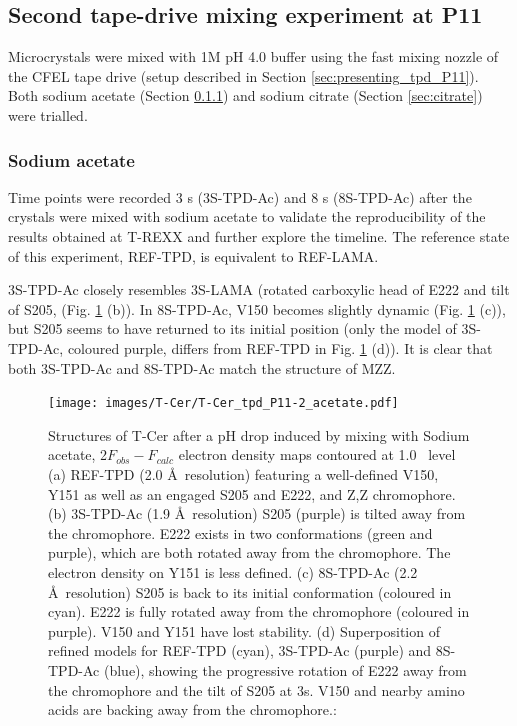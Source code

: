 \subsection{Second tape-drive mixing experiment at P11}\label{sec:P11-2}

Microcrystals were mixed with 1M pH 4.0 buffer using the fast mixing nozzle of the CFEL tape drive (setup described in Section \ref{sec:presenting_tpd_P11}). Both sodium acetate (Section \ref{sec:acetate}) and sodium citrate (Section \ref{sec:citrate}) were trialled. 

\subsubsection{Sodium acetate}\label{sec:acetate}
Time points were recorded 3 s (3S-TPD-Ac) and 8 s (8S-TPD-Ac) after the crystals were mixed with sodium acetate to validate the reproducibility of the results obtained at T-REXX and further explore the timeline. The reference state of this experiment, REF-TPD, is equivalent to REF-LAMA.

3S-TPD-Ac closely resembles 3S-LAMA (rotated carboxylic head of E222 and tilt of S205, (Fig. \ref{fig:T-Cer_P11-2_Ac_results} (b)). In 8S-TPD-Ac, V150 becomes slightly dynamic (Fig. \ref{fig:T-Cer_P11-2_Ac_results} (c)), but S205 seems to have returned to its initial position (only the model of 3S-TPD-Ac, coloured purple, differs from REF-TPD in Fig. \ref{fig:T-Cer_P11-2_Ac_results} (d)). It is clear that both 3S-TPD-Ac and 8S-TPD-Ac match the structure of MZZ. 
\begin{figure}[H] %
    \centering
        \noindent \texttt{[image: images/T-Cer/T-Cer\_tpd\_P11-2\_acetate.pdf]}
    \hfill
    \caption{Structures of T-Cer after a pH drop induced by mixing with Sodium acetate, 2\(F_{obs} - F_{calc}\) electron density maps contoured at 1.0 \textsigma\ level (a) REF-TPD (2.0 \AA\ resolution) featuring a well-defined V150, Y151 as well as an engaged S205 and E222, and Z,Z chromophore. (b) 3S-TPD-Ac (1.9 \AA\ resolution) S205 (purple) is tilted away from the chromophore. E222 exists in two conformations (green and purple), which are both rotated away from the chromophore. The electron density on Y151 is less defined.  (c) 8S-TPD-Ac (2.2 \AA\ resolution) S205 is back to its initial conformation (coloured in cyan). E222 is fully rotated away from the chromophore (coloured in purple). V150 and Y151 have lost stability. (d) Superposition of refined models for REF-TPD (cyan), 3S-TPD-Ac (purple) and 8S-TPD-Ac (blue), showing the progressive rotation of E222 away from the chromophore and the tilt of S205 at 3s. V150 and nearby amino acids are backing away from the chromophore.: }\label{fig:T-Cer_P11-2_Ac_results}
\end{figure}


